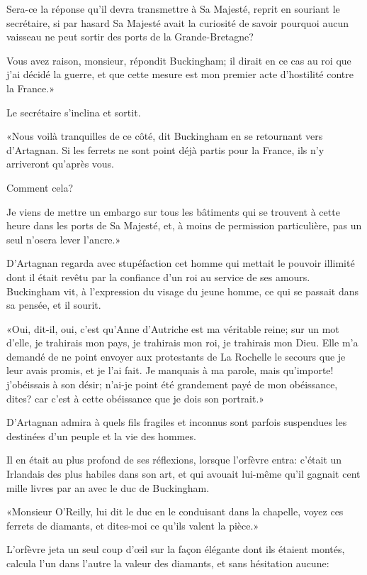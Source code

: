 \speak  Sera-ce la réponse qu'il devra transmettre à Sa Majesté, reprit en souriant le secrétaire, si par hasard Sa Majesté avait la curiosité de savoir pourquoi aucun vaisseau ne peut sortir des ports de la Grande-Bretagne? 

\speak  Vous avez raison, monsieur, répondit Buckingham; il dirait en ce cas au roi que j'ai décidé la guerre, et que cette mesure est mon premier acte d'hostilité contre la France.» 

Le secrétaire s'inclina et sortit. 

«Nous voilà tranquilles de ce côté, dit Buckingham en se retournant vers d'Artagnan. Si les ferrets ne sont point déjà partis pour la France, ils n'y arriveront qu'après vous. 

\speak  Comment cela? 

\speak  Je viens de mettre un embargo sur tous les bâtiments qui se trouvent à cette heure dans les ports de Sa Majesté, et, à moins de permission particulière, pas un seul n'osera lever l'ancre.» 

D'Artagnan regarda avec stupéfaction cet homme qui mettait le pouvoir illimité dont il était revêtu par la confiance d'un roi au service de ses amours. Buckingham vit, à l'expression du visage du jeune homme, ce qui se passait dans sa pensée, et il sourit. 

«Oui, dit-il, oui, c'est qu'Anne d'Autriche est ma véritable reine; sur un mot d'elle, je trahirais mon pays, je trahirais mon roi, je trahirais mon Dieu. Elle m'a demandé de ne point envoyer aux protestants de La Rochelle le secours que je leur avais promis, et je l'ai fait. Je manquais à ma parole, mais qu'importe! j'obéissais à son désir; n'ai-je point été grandement payé de mon obéissance, dites? car c'est à cette obéissance que je dois son portrait.» 

D'Artagnan admira à quels fils fragiles et inconnus sont parfois suspendues les destinées d'un peuple et la vie des hommes. 

Il en était au plus profond de ses réflexions, lorsque l'orfèvre entra: c'était un Irlandais des plus habiles dans son art, et qui avouait lui-même qu'il gagnait cent mille livres par an avec le duc de Buckingham. 

«Monsieur O'Reilly, lui dit le duc en le conduisant dans la chapelle, voyez ces ferrets de diamants, et dites-moi ce qu'ils valent la pièce.» 

L'orfèvre jeta un seul coup d'œil sur la façon élégante dont ils étaient montés, calcula l'un dans l'autre la valeur des diamants, et sans hésitation aucune: 


